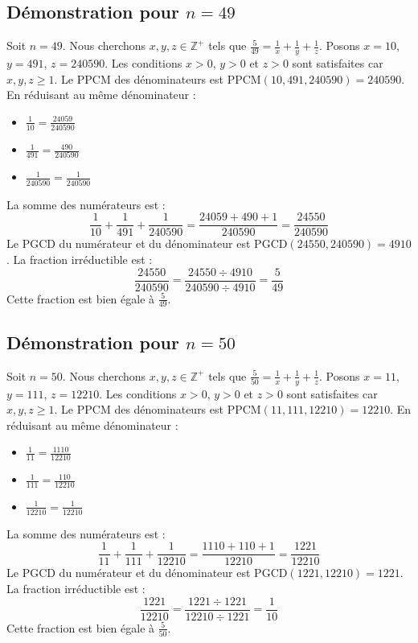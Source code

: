 \documentclass[11pt,a4paper]{article}
\begin{document}
\subsection{Démonstration pour $n = 49$}
Soit $n = 49$. Nous cherchons $x, y, z \in \mathbb{Z}^{+}$ tels que $\frac{5}{49} = \frac{1}{x} + \frac{1}{y} + \frac{1}{z}$.
Posons $x = 10$, $y = 491$, $z = 240590$.
Les conditions $x > 0$, $y > 0$ et $z > 0$ sont satisfaites car $x, y, z \geq 1$.
Le PPCM des dénominateurs est $\text{PPCM}(10, 491, 240590) = 240590$.
En réduisant au même dénominateur :
\begin{itemize}
    \item $\frac{1}{10} = \frac{24059}{240590}$
    \item $\frac{1}{491} = \frac{490}{240590}$
    \item $\frac{1}{240590} = \frac{1}{240590}$
\end{itemize}
La somme des numérateurs est :
$$ \frac{1}{10} + \frac{1}{491} + \frac{1}{240590} = \frac{24059 + 490 + 1}{240590} = \frac{24550}{240590} $$
Le PGCD du numérateur et du dénominateur est $\text{PGCD}(24550, 240590) = 4910$.
La fraction irréductible est :
$$ \frac{24550}{240590} = \frac{24550 \div 4910}{240590 \div 4910} = \frac{5}{49} $$
Cette fraction est bien égale à $\frac{5}{49}$.

\subsection{Démonstration pour $n = 50$}
Soit $n = 50$. Nous cherchons $x, y, z \in \mathbb{Z}^{+}$ tels que $\frac{5}{50} = \frac{1}{x} + \frac{1}{y} + \frac{1}{z}$.
Posons $x = 11$, $y = 111$, $z = 12210$.
Les conditions $x > 0$, $y > 0$ et $z > 0$ sont satisfaites car $x, y, z \geq 1$.
Le PPCM des dénominateurs est $\text{PPCM}(11, 111, 12210) = 12210$.
En réduisant au même dénominateur :
\begin{itemize}
    \item $\frac{1}{11} = \frac{1110}{12210}$
    \item $\frac{1}{111} = \frac{110}{12210}$
    \item $\frac{1}{12210} = \frac{1}{12210}$
\end{itemize}
La somme des numérateurs est :
$$ \frac{1}{11} + \frac{1}{111} + \frac{1}{12210} = \frac{1110 + 110 + 1}{12210} = \frac{1221}{12210} $$
Le PGCD du numérateur et du dénominateur est $\text{PGCD}(1221, 12210) = 1221$.
La fraction irréductible est :
$$ \frac{1221}{12210} = \frac{1221 \div 1221}{12210 \div 1221} = \frac{1}{10} $$
Cette fraction est bien égale à $\frac{5}{50}$.
\end{document}
